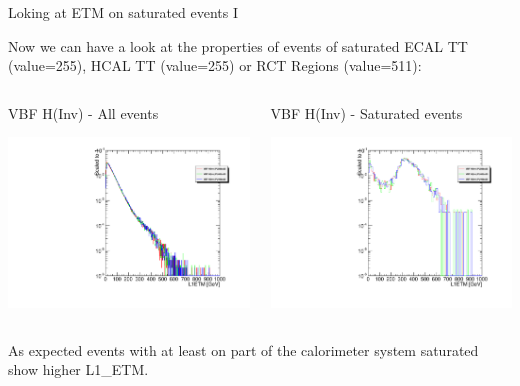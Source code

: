 \documentclass[8pt]{beamer}
\begin{document}
\begin{frame}{Loking at ETM on saturated events I}

Now we can have a look at the properties of events of saturated ECAL TT (value=255), HCAL TT (value=255) or RCT Regions (value=511):

\begin{columns}
 
\begin{block}{VBF H(Inv) - All events}
\centering

\includegraphics[width=\linewidth]{fig/L1ETM_Sig.pdf}

\end{block}

\begin{block}{VBF H(Inv) - Saturated events}
\centering

\includegraphics[width=\linewidth]{fig/L1ETM_Saturated_Sig.pdf}

\end{block}

\end{columns}

As expected events with at least on part of the calorimeter system saturated show higher L1\_ETM.

\end{frame}
\end{document}
